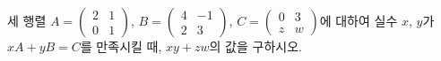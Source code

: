 세 행렬 $A=\begin{pmatrix} 2 & 1 \\ 0 & 1 \end{pmatrix}$, $B=\begin{pmatrix} 4 & -1 \\ 2 & 3 \end{pmatrix}$, $C=\begin{pmatrix} 0 & 3 \\ z & w \end{pmatrix}$에 대하여 실수 $x$, $y$가 $xA+yB=C$를 만족시킬 때, $xy+zw$의 값을 구하시오. 
